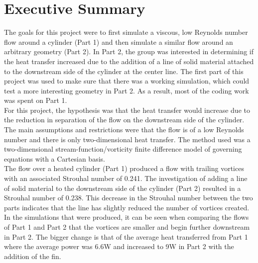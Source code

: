 \section*{Executive Summary}


The goals for this project were to first simulate a viscous, low Reynolds number flow around a cylinder (Part 1) and then simulate a similar flow around an arbitrary geometry (Part 2). In Part 2, the group was  interested in determining if the heat transfer increased due to the addition of a line of solid material attached to the downstream side of the cylinder at the center line. The first part of this project was used to make sure that there was a working simulation, which could test a more interesting geometry in Part 2. As a result, most of the coding work was spent on Part 1.\\

For this project, the hypothesis was that the heat transfer would increase due to the reduction in separation of the flow on the downstream side of the cylinder. The main assumptions and restrictions were that the flow is of a low Reynolds number and there is only two-dimensional heat transfer. The method used was a two-dimensional stream-function/vorticity finite difference model of governing equations with a Cartesian basis.\\


The flow over a heated cylinder (Part 1) produced a flow with trailing vortices with an associated Strouhal number of 0.241.  The investigation of adding a line of solid material to the downstream side of the cylinder (Part 2) resulted in a Strouhal number of 0.238.  This decrease in the Strouhal number between the two parts indicates that the line has slightly reduced the number of vortices created. In the simulations that were produced, it can be seen when comparing the flows of Part 1 and Part 2 that the vortices are smaller and begin further downstream in Part 2. The bigger change is that of the average heat transferred from Part 1 where the average power was 6.6W and increased to 9W in Part 2 with the addition of the fin. 

\clearpage